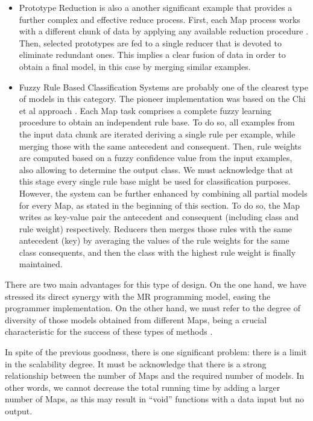 \documentclass[3p,review]{elsarticle}
\begin{document}
\begin{itemize}
		\item Prototype Reduction \cite{TrigueroPBGH15-PR} is also a another significant example that provides a further complex and effective reduce process. First, each Map process works with a different chunk of data by applying any available reduction procedure \cite{TrigueroDGH12}. Then, selected prototypes are fed to a single reducer that is devoted to eliminate redundant ones. This implies a clear fusion of data in order to obtain a final model, in this case by merging similar examples. 
		
		\item Fuzzy Rule Based Classification Systems \cite{Fer16_fuzzyBD} are probably one of the clearest type of models in this category. The pioneer implementation was based on the Chi et al approach \cite{RioLBH15-Fuzzy,Lopez2014}. Each Map task comprises a complete fuzzy learning procedure to obtain an independent rule base. To do so, all examples from the input data chunk are iterated deriving a single rule per example, while merging those with the same antecedent and consequent. Then, rule weights are computed based on a fuzzy confidence value from the input examples, also allowing to determine the output class. We must acknowledge that at this stage every single rule base might be used for classification purposes. However, the system can be further enhanced by combining all partial models for every Map, as stated in the beginning of this section. To do so, the Map writes as key-value pair the antecedent and consequent (including class and rule weight) respectively. Reducers then merges those rules with the same antecedent (key) by averaging the values of the rule weights for the same class consequents, and then the class with the highest rule weight is finally maintained. 
		
	\end{itemize}
	
	There are two main advantages for this type of design. On the one hand, we have stressed its direct synergy with the MR programming model, easing the programmer implementation. On the other hand, we must refer to the degree of diversity of those models obtained from different Maps, being a crucial characteristic for the success of these types of methods \cite{Kuncheva05}. 
	
	In spite of the previous goodness, there is one significant problem: there is a limit in the scalability degree. It must be acknowledge that there is a strong relationship between the number of Maps and the required number of models. In other words, we cannot decrease the total running time by adding a larger number of Maps, as this may result in ``void'' functions with a data input but no output. 
	
\end{document}
